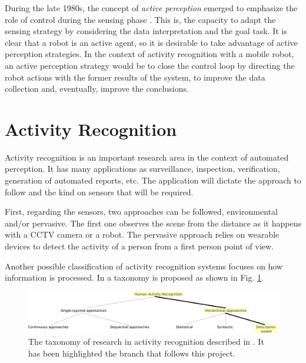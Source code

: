 During the late 1980s, the concept of \textit{active perception} emerged to emphasize the role of control during the sensing phase \citep{Bajcsy88_ActivePerception}.
This is, the capacity to adapt the sensing strategy by considering the data interpretation and the goal task.
It is clear that a robot is an active agent, so it is desirable to take advantage of active perception strategies.
In the context of activity recognition with a mobile robot, an active perception strategy would be to close the control loop by directing the robot actions with the former results of the system, to improve the data collection and, eventually, improve the conclusions.




\section{Activity Recognition} 

Activity recognition is an important research area in the context of automated perception. 
It has many applications as surveillance, inspection, verification, generation of automated reports, etc.
The application will dictate the approach to follow and the kind on sensors that will be required.

First, regarding the sensors, two approaches can be followed, environmental and/or pervasive. 
The first one observes the scene from the distance as it happens with a CCTV camera or a robot. 
The pervasive approach relies on wearable devices to detect the activity of a person from a first person point of view.

Another possible classification of activity recognition systems focuses on how information is processed.
In \citep{Aggarwal11_HumanActivity} a taxonomy is proposed as shown in Fig. \ref{fig:taxonomy}.  

\begin{figure}[h]
\centering
\includegraphics[width=\textwidth]{fig/img_Aggarwal_Taxonomy3.pdf}
\caption{The taxonomy of research in activity recognition described in \cite{Aggarwal11_HumanActivity}. It has been highlighted the branch that follows this project.}
\label{fig:taxonomy}
\end{figure}

